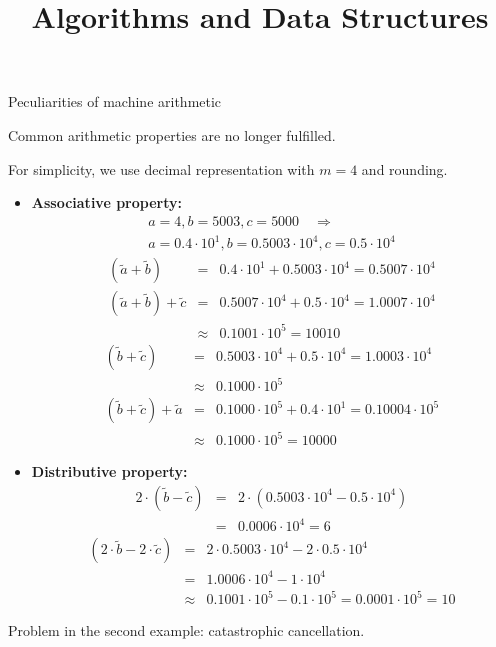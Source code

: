 \documentclass[11pt,compress,t,notes=noshow, xcolor=table]{beamer}
\title{Algorithms and Data Structures}
\begin{document}



\begin{vbframe}{Peculiarities of machine arithmetic}

Common arithmetic properties are no longer fulfilled.

\vspace*{0.1cm}

For simplicity, we use decimal representation with $m = 4$ and rounding.

\begin{itemize}
\item \textbf{Associative property:}
 \begin{eqnarray*}
 &a = 4, b = 5003, c = 5000 \quad \Rightarrow \quad& \\
 &a = 0.4 \cdot 10^1, b = 0.5003 \cdot 10^4, c = 0.5 \cdot 10^4&
 \end{eqnarray*}
 \begin{eqnarray*}
 (\tilde a + \tilde b) &=& 0.4 \cdot 10^1 + 0.5003 \cdot 10^4 = 0.5007 \cdot 10^4 \\
 (\tilde a + \tilde b) + \tilde c &=& 0.5007 \cdot 10^4 + 0.5 \cdot 10^4 = 1.0007 \cdot 10^4 \\
 &\approx& 0.1001 \cdot 10^5 = 10010
 \end{eqnarray*}
 \begin{eqnarray*}
 (\tilde b + \tilde c) &=& 0.5003 \cdot 10^4 + 0.5 \cdot 10^4 = 1.0003 \cdot 10^4 \\
 &\approx& 0.1000 \cdot 10^5 \\
 (\tilde b + \tilde c) + \tilde a &=& 0.1000 \cdot 10^5 + 0.4 \cdot 10^1 = 0.10004 \cdot 10^5 \\
 &\approx& 0.1000 \cdot 10^5 = 10000
 \end{eqnarray*}

 \framebreak

\item \textbf{Distributive property:}
 \begin{eqnarray*}
 2 \cdot (\tilde b - \tilde c) &=& 2 \cdot (0.5003 \cdot 10^4 - 0.5 \cdot 10^4) \\
 &=& 0.0006 \cdot 10^4 = 6
 \end{eqnarray*}
 \begin{eqnarray*}
 (2 \cdot \tilde b - 2 \cdot \tilde c) &=& 2 \cdot 0.5003 \cdot 10^4 - 2 \cdot 0.5 \cdot 10^4 \\
 &=& 1.0006 \cdot 10^4 - 1 \cdot 10^4 \\
 &\approx& 0.1001 \cdot 10^5 - 0.1 \cdot 10^5 = 0.0001 \cdot 10^5 = 10
 \end{eqnarray*}
\end{itemize}
Problem in the second example: catastrophic cancellation.
\end{vbframe}
\end{document}
